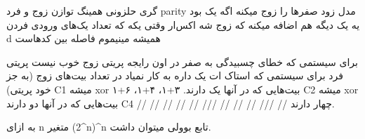 \documentclass[a5paper]{article}
\begin{document}
گری حلزونی
همینگ
توازن زوج و فرد parity
مدل زود صفرها را زوج میکنه اگه یک بود یه یک دیگه هم اضافه میکنه که زوج شه
اکس‌ار وقتی یکه که تعداد یک‌های ورودی فردن
d همیشه مینیموم فاصله بین کدهاست

برای سیستمی که خطای چسبیدگی به صفر در اون رایجه پریتی زوج خوب نیست
پریتی فرد برای سیستمی که استاک ات یک داره به کار نمیاد
در تعداد بیت‌های زوج (به جز خود پریتی)
C1 میشه xor بیت‌هایی که در آنها یک دارند. ۳+۱، ۴+۱، ۶+۱
C2 میشه xor بیت‌هایی که در آنها دو دارند
C4 // // // // // /// // // // /// // چهار دارند.

به ازای n متغیر (2^n)^n تابع بوولی میتوان داشت.







\end{document}
